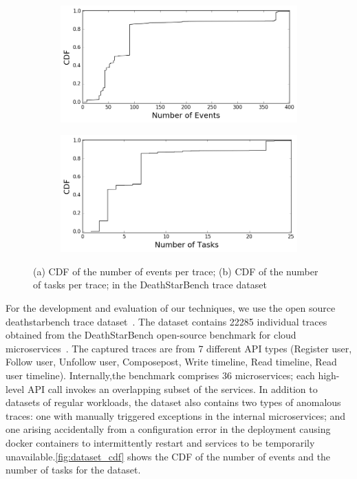\begin{figure}
    \centering%
    \begin{subfigure}{0.5\textwidth}%
        \includegraphics[width=\linewidth]{"fig/events_cdf"}%
        \caption{}%
    \end{subfigure}%
    \begin{subfigure}{0.5\textwidth}%
        \includegraphics[width=\linewidth]{"fig/tasks_cdf"}%
        \caption{}%
    \end{subfigure}%
    \caption{(a) CDF of the number of events per trace; (b) CDF of the number of tasks per trace; in the DeathStarBench trace dataset}%
    \label{fig:dataset_cdf}%
\end{figure}

For the development and evaluation of our techniques, we use the open source deathstarbench trace dataset~\cite{anand2019deathstarbenchtraces}.
The dataset contains 22285 individual traces obtained from the DeathStarBench open-source benchmark for cloud microservices~\cite{gan2019deathstar}.
The captured traces are from 7 different API types (Register user, Follow user, Unfollow user, Composepost, Write timeline, Read timeline, Read user timeline). 
Internally,the benchmark comprises 36 microservices; each high-level API call invokes an overlapping subset of the services. In addition to datasets of regular workloads, the dataset also
contains two types of anomalous traces: one with manually triggered exceptions in the internal microservices; and one arising accidentally from a configuration error in the 
deployment causing docker containers to intermittently restart and services to be temporarily unavailable.\autoref{fig:dataset_cdf} shows the CDF of the number of events
and the number of tasks for the dataset.